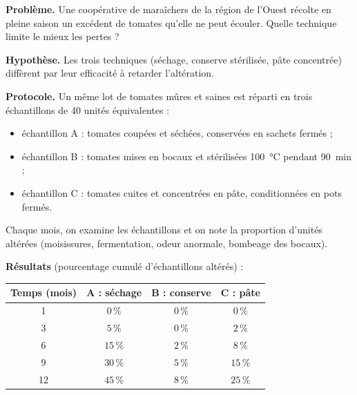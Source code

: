 \documentclass[11pt]{article}
\begin{document}
\begin{experience}
\textbf{Problème.} Une coopérative de maraîchers de la région de l'Ouest récolte en pleine saison un excédent de tomates qu'elle ne peut écouler. Quelle technique limite le mieux les pertes ?

\textbf{Hypothèse.} Les trois techniques (séchage, conserve stérilisée, pâte concentrée) diffèrent par leur efficacité à retarder l'altération.

\textbf{Protocole.} Un même lot de tomates mûres et saines est réparti en trois échantillons de 40 unités équivalentes :
\begin{itemize}
\item échantillon A : tomates coupées et séchées, conservées en sachets fermés ;
\item échantillon B : tomates mises en bocaux et stérilisées \SI{100}{\celsius} pendant \SI{90}{min} ;
\item échantillon C : tomates cuites et concentrées en pâte, conditionnées en pots fermés.
\end{itemize}
Chaque mois, on examine les échantillons et on note la proportion d'unités altérées (moisissures, fermentation, odeur anormale, bombeage des bocaux).

\textbf{Résultats} (pourcentage cumulé d'échantillons altérés) :
\begin{center}
\begin{tabular}{|c|c|c|c|}
\hline
\rowcolor{popblueL} \textbf{Temps (mois)} & \textbf{A : séchage} & \textbf{B : conserve} & \textbf{C : pâte} \\
\hline
1 & $0\,\%$ & $0\,\%$ & $0\,\%$ \\
\hline
3 & $5\,\%$ & $0\,\%$ & $2\,\%$ \\
\hline
6 & $15\,\%$ & $2\,\%$ & $8\,\%$ \\
\hline
9 & $30\,\%$ & $5\,\%$ & $15\,\%$ \\
\hline
12 & $45\,\%$ & $8\,\%$ & $25\,\%$ \\
\hline
\end{tabular}
\end{center}
\end{experience}
\end{document}
